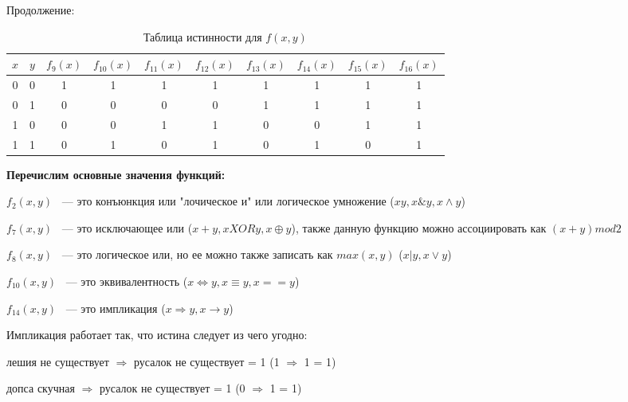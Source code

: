 \documentclass[russian]{lecture-notes}
\begin{document}
\begin{sloppypar}
\begin{example}
            Продолжение:

            \begin{table}[h!]
                \centering
                \begin{tabular}{|c|c|c|c|c|c|c|c|c|c|}
                    \hline
                    $x$ & $y$ & $f_9(x)$ & $f_{10}(x)$ & $f_{11}(x)$ & $f_{12}(x)$ & $f_{13}(x)$ & $f_{14}(x)$ & $f_{15}(x)$ & $f_{16}(x)$ \\ \hline
                    0      & 0   & 1        & 1           & 1           & 1           & 1           & 1           & 1           & 1           \\ \hline
                    0      & 1   & 0        & 0           & 0           & 0           & 1           & 1           & 1           & 1           \\ \hline
                    1      & 0   & 0        & 0           & 1           & 1           & 0           & 0           & 1           & 1           \\ \hline
                    1      & 1   & 0        & 1           & 0           & 1           & 0           & 1           & 0           & 1           \\ \hline
                \end{tabular}
                \caption{Таблица истинности для $f(x,y)$}
            \end{table}

            \textbf{Перечислим основные значения функций:}

            $f_2(x,y)$ ~--- это конъюнкция или "лочическое и"  или логическое умножение ($xy, x\&y, x \wedge y$)

            $f_7(x,y)$ ~--- это исключающее или ($x+y, x XOR y, x \oplus y$), также данную функцию можно ассоциировать как $(x+y) mod 2$

            $f_8(x,y)$ ~--- это логическое или, но ее можно также записать как $max(x,y)$  ($x|y, x \lor y$)

            $f_{10}(x,y)$ ~--- это эквивалентность ($x \Leftrightarrow y, x \equiv y, x == y$)

            $f_{14}(x,y)$ ~--- это импликация ($x \Rightarrow y, x \rightarrow y$)

            Импликация работает так, что истина следует из чего угодно:

            лешия не существует $\Rightarrow$ русалок не существует = 1 (1 $\Rightarrow$ 1 = 1)

            допса скучная $\Rightarrow$ русалок не существует = 1 (0 $\Rightarrow$ 1 = 1)


\end{example}
\end{sloppypar}
\end{document}
